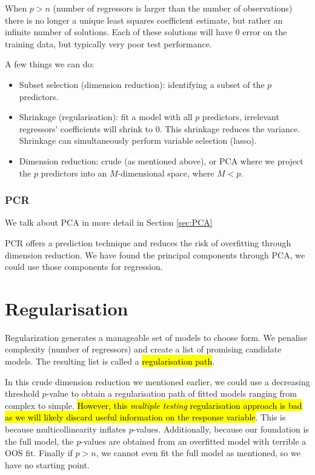 \documentclass[11pt]{article}
\begin{document}
\begin{note}
    When $p>n$ (number of regressors is larger than the number of observations) there is no longer a unique least squares coefficient estimate, but rather an infinite number of solutions. Each of these solutions will have 0 error on the training data, but typically very poor test performance. 
\end{note}

A few things we can do:
\begin{itemize}
    \item Subset selection (dimension reduction): identifying a subset of the $p$ predictors.
    \item Shrinkage (regularisation): fit a model with all $p$ predictors, irrelevant regressors' coefficients will shrink to 0. This shrinkage reduces the variance. Shrinkage can simultaneously perform variable selection (lasso).
    \item Dimension reduction: crude (as mentioned above), or PCA where we project the $p$ predictors into an $M$-dimensional space, where $M<p$.
\end{itemize}


\subsubsection{PCR}
We talk about PCA in more detail in Section \ref{sec:PCA}

PCR offers a prediction technique and reduces the risk of overfitting through dimension reduction. We have found the principal components through PCA, we could use those components for regression. 

\newpage
\section{Regularisation}

Regularization generates a manageable set of models to choose form. We penalise complexity (number of regressors) and create a list of promising candidate models. The resulting list is called a \hl{regularisation path}.

In this crude dimension reduction we mentioned earlier, we could use a decreasing threshold $p$-value to obtain a regularisation path of fitted models ranging from complex to simple. \hl{However, this \textit{multiple testing} regularisation approach is bad as we will likely discard useful information on the response variable}. This is because multicollinearity inflates $p$-values. Additionally, because our foundation is the full model, the $p$-values are obtained from an overfitted model with terrible a OOS fit. Finally if $p>n$, we cannot even fit the full model as mentioned, so we have no starting point.
\end{document}
